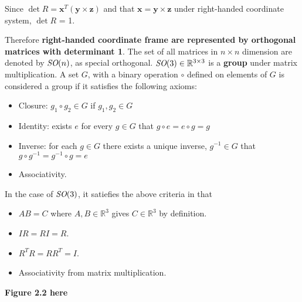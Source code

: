 \documentclass[letterpaper]{article}
\begin{document}
Since $\det R = \mathbf{x}^T(\mathbf{y} \times \mathbf{z})$ and that $\mathbf{x} = \mathbf{y} \times \mathbf{z}$ under
right-handed coordinate system, $\det R$ = 1. 

Therefore \textbf{right-handed coordinate frame are represented by orthogonal matrices with determinant 1}. 
The set of all matrices in $n \times n$ dimension are denoted by $\emph{SO}(n)$, as special orthogonal.
$\emph{SO}(3) \in \mathbb{R}^{3\times 3}$ is a \textbf{group} under matrix multiplication. A set $G$, with a binary
operation $\circ$ defined on elements of $G$ is considered a group if it satisfies the following axioms:
\begin{itemize}
  \setlength\itemsep{0pt}
  \item Closure: $g_1 \circ g_2 \in G$ if $g_1, g_2 \in G$
  \item Identity: exists $e$ for every $g \in G$ that $g\circ e = e\circ g = g$
  \item Inverse: for each $g \in G$ there exists a unique inverse, $g^{-1} \in G$ that $g \circ g^{-1} = g^{-1} \circ g = e$
  \item Associativity. 
\end{itemize}

In the case of $\emph{SO}(3)$, it satiefies the above criteria in that
\begin{itemize}
  \setlength\itemsep{0pt}
  \item $AB=C$ where $A, B \in \mathbb{R}^3$ gives $C\in \mathbb{R}^3$ by definition.
  \item $IR = RI = R$.
  \item $R^TR = RR^T = I$.
  \item Associativity from matrix multiplication.
\end{itemize}

\textbf{Figure 2.2 here}
\end{document}
